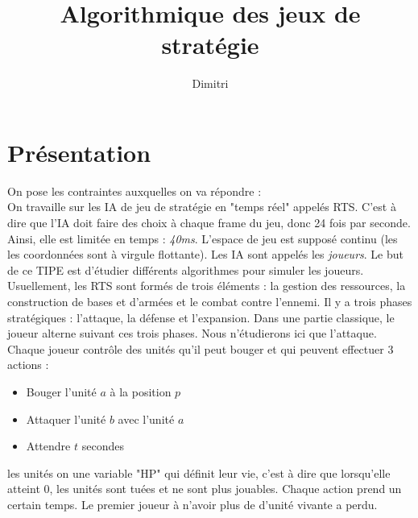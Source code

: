 \documentclass[a4paper, 11pt]{article}
\theoremstyle{definition}
\begin{document}
\title{Algorithmique des jeux de stratégie}
\author{Dimitri }

\section*{Présentation}
On pose les contraintes auxquelles on va répondre :\\
On travaille sur les IA de jeu de stratégie en "temps réel" appelés RTS. C'est à dire que
l'IA doit faire des choix à chaque frame du jeu, donc 24 fois par seconde. Ainsi,
elle est limitée en temps : \emph{40ms}. L'espace de jeu est supposé continu (les
les coordonnées sont à virgule flottante). Les IA sont appelés les \emph{joueurs}.
Le but de ce TIPE est d'étudier différents algorithmes pour simuler les joueurs.
Usuellement, les RTS sont formés de trois éléments : la gestion des ressources,
la construction de bases et d'armées et le combat contre l'ennemi. Il y a trois 
phases stratégiques : l'attaque, la défense et l'expansion. Dans une partie classique,
le joueur alterne suivant ces trois phases. Nous n'étudierons ici que l'attaque.
\\
Chaque joueur contrôle des unités qu'il peut bouger et qui peuvent effectuer 3
actions :
\begin{itemize}
    \item Bouger l'unité $a$ à la position $p$
    \item Attaquer l'unité $b$ avec l'unité $a$
    \item Attendre $t$ secondes
\end{itemize}
les unités on une variable "HP" qui définit leur vie, c'est à dire que lorsqu'elle
atteint 0, les unités sont tuées et ne sont plus jouables. Chaque action prend
un certain temps.
Le premier joueur à n'avoir plus de d'unité vivante a perdu.
\end{document}
